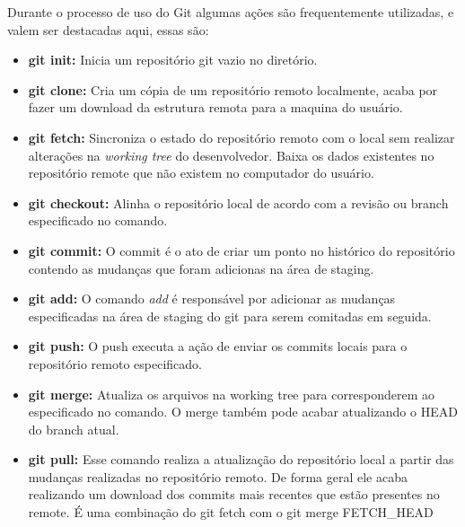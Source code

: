        	Durante o processo de uso do Git algumas ações são frequentemente utilizadas, e valem ser destacadas aqui, essas são:
        	\begin{itemize}
            	\item \textbf{git init:} 
            	Inicia um repositório git vazio no diretório.
            	
            	\item \textbf{git clone:}
            	Cria um cópia de um repositório remoto localmente, acaba por fazer um download da estrutura remota para a maquina do usuário.
            	
            	\item \textbf{git fetch:}
        	    Sincroniza o estado do repositório remoto com o local sem realizar alterações na \textit{working tree} do desenvolvedor. Baixa os dados existentes no repositório remote que não existem no computador do usuário.
        	
            	\item \textbf{git checkout:}
            	Alinha o repositório local de acordo com a revisão ou branch especificado no comando.
            	
            	\item \textbf{git commit:}
            	O commit é o ato de criar um ponto no histórico do repositório contendo as mudanças que foram adicionas na área de staging.
            	
            	\item \textbf{git add:}
            	O comando \textit{add} é responsável por adicionar as mudanças especificadas na área de staging do git para serem comitadas em seguida.
            	
            	\item \textbf{git push:}
            	O push executa a ação de enviar os commits locais para o repositório remoto especificado.
            	
            	\item \textbf{git merge:}
            	Atualiza os arquivos na working tree para corresponderem ao especificado no comando. O merge também pode acabar atualizando o HEAD do branch atual.
            	
            	\item \textbf{git pull:}
            	Esse comando realiza a atualização do repositório local a partir das mudanças realizadas no repositório remoto. De forma geral ele acaba realizando um download dos commits mais recentes que estão presentes no remote. É uma combinação do git fetch com o git merge FETCH\_HEAD
        	\end{itemize}
